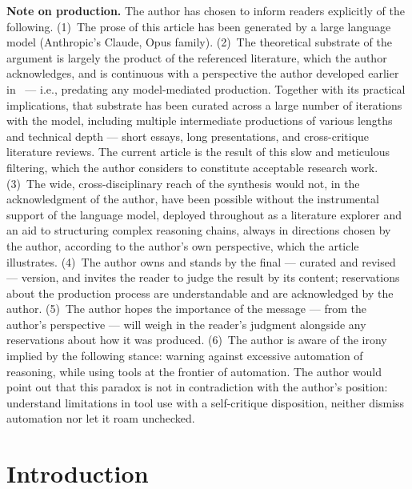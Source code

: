 \documentclass[11pt,a4paper]{article}
\begin{document}
\vspace{0.8em}
\noindent\textbf{Note on production.} The author has chosen to inform
readers explicitly of the following. (1)~The prose of this article has
been generated by a large language model (Anthropic's Claude, Opus
family). (2)~The theoretical substrate of the argument is largely the
product of the referenced literature, which the author acknowledges,
and is continuous with a perspective the author developed earlier
in~\citet{Fauriat2022} --- i.e., predating any model-mediated production.
Together with its practical implications,
that substrate has been curated across a large number of iterations
with the model, including multiple intermediate productions of various lengths
and technical depth --- short essays, long presentations, and cross-critique literature reviews.
The current article is the result of this slow
and meticulous filtering, which the author considers to constitute
acceptable research work. (3)~The wide, cross-disciplinary reach of
the synthesis would not, in the acknowledgment of the author, have
been possible without the instrumental support of the language
model, deployed throughout as a literature explorer and an aid to structuring complex
reasoning chains,
always in directions chosen by the author, according to the author's own perspective,
which the article illustrates.
(4)~The author owns and stands by the final --- curated and revised
--- version, and invites the reader to judge the result by its
content; reservations about the production process are understandable
and are acknowledged by the author. (5)~The author hopes the importance of the message --- from the author's
perspective --- will weigh in the reader's judgment alongside any
reservations about how it was produced. (6)~The author is aware of the
irony implied by the following stance: warning against excessive automation of
reasoning, while using tools at the frontier of automation. The author would point
out that this paradox is not in contradiction with the author's position:
understand limitations in tool use with a self-critique disposition, neither dismiss
automation nor let it roam unchecked.

\vspace{1.5em}

\section{Introduction}
\label{sec:intro}
\end{document}
